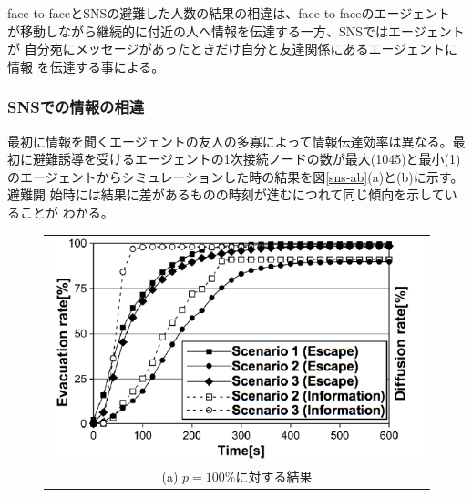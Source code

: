 \documentclass[a4j]{jarticle}
\begin{document}
face to faceとSNSの避難した人数の結果の相違は、face to faceのエージェント
が移動しながら継続的に付近の人へ情報を伝達する一方、SNSではエージェントが
自分宛にメッセージがあったときだけ自分と友達関係にあるエージェントに情報
を伝達する事による。

\subsubsection{SNSでの情報の相違}
最初に情報を聞くエージェントの友人の多寡によって情報伝達効率は異なる。最
初に避難誘導を受けるエージェントの1次接続ノードの数が最大(1045)と最小(1)
のエージェントからシミュレーションした時の結果を図\ref{sns-ab}(a)と(b)に示す。避難開
始時には結果に差があるものの時刻が進むにつれて同じ傾向を示していることが
わかる。

\begin{figure}[h]
\centering
\begin{tabular}{c}
\includegraphics[height=\linewidth,angle=-90]{fig/p-100-plot-with-legend.pdf}\\
(a) $p=100\%$に対する結果\\

\end{tabular}
\end{figure}
\end{document}
